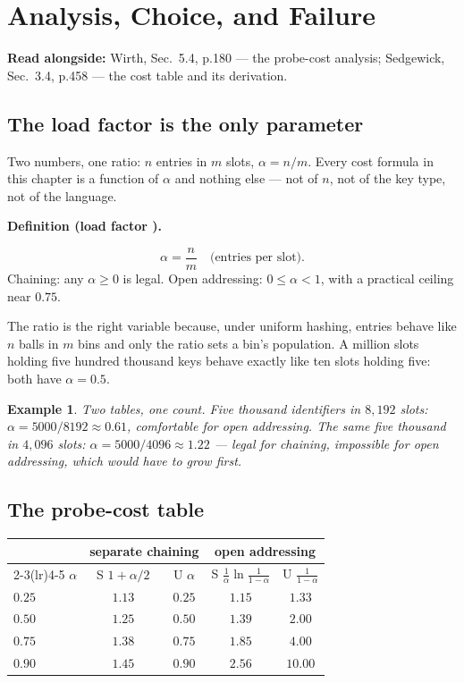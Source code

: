 \documentclass[11pt]{article}
\newtheorem{example}{Example}[section]
\newenvironment{definitionbox}[1]{%
  \par\noindent\textbf{Definition (#1).}\ \itshape
}{\par\vspace{0.3em}}
\begin{document}
\section{Analysis, Choice, and Failure}

\textbf{Read alongside:} Wirth, Sec.~5.4, p.180 --- the probe-cost analysis; Sedgewick, Sec.~3.4, p.458 --- the cost table and its derivation.

\subsection{The load factor is the only parameter}

Two numbers, one ratio: $n$ entries in $m$ slots, $\alpha = n/m$. Every cost formula in this chapter is a function of $\alpha$ and nothing else --- not of $n$, not of the key type, not of the language.

\begin{definitionbox}{load factor \cite{Sedgewick2011_algorithms}}
\[ \alpha = \frac{n}{m} \quad\text{(entries per slot)} . \]
Chaining: any $\alpha \ge 0$ is legal. Open addressing: $0 \le \alpha < 1$, with a practical ceiling near $0.75$.
\end{definitionbox}

The ratio is the right variable because, under uniform hashing, entries behave like $n$ balls in $m$ bins and only the ratio sets a bin's population. A million slots holding five hundred thousand keys behave exactly like ten slots holding five: both have $\alpha = 0.5$.

\begin{example}
\emph{Two tables, one count.} Five thousand identifiers in $8{,}192$ slots: $\alpha = 5000/8192 \approx 0.61$, comfortable for open addressing. The same five thousand in $4{,}096$ slots: $\alpha = 5000/4096 \approx 1.22$ --- legal for chaining, impossible for open addressing, which would have to grow first.
\end{example}

\subsection{The probe-cost table}

\begin{center}
{\footnotesize
\begin{tabular}{lcccc}
  \toprule
  & \multicolumn{2}{c}{separate chaining} &
    \multicolumn{2}{c}{open addressing} \\
  \cmidrule(lr){2-3}\cmidrule(lr){4-5}
  $\alpha$ & S $1+\alpha/2$ & U $\alpha$
    & S $\frac{1}{\alpha}\ln\frac{1}{1-\alpha}$ & U $\frac{1}{1-\alpha}$ \\
  \midrule
  $0.25$ & $1.13$ & $0.25$ & $1.15$ & $1.33$ \\
  $0.50$ & $1.25$ & $0.50$ & $1.39$ & $2.00$ \\
  $0.75$ & $1.38$ & $0.75$ & $1.85$ & $4.00$ \\
  $0.90$ & $1.45$ & $0.90$ & $2.56$ & $10.00$ \\
  \bottomrule
\end{tabular}}
\end{center}
\end{document}
